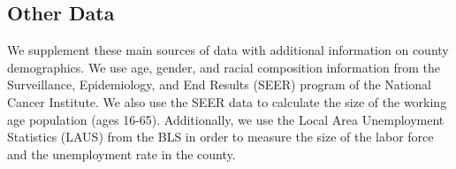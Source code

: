 \subsection{Other Data}
We supplement these main sources of data with additional information on county demographics. We use age, gender, and racial composition information from the Surveillance, Epidemiology, and End Results (SEER) program of the National Cancer Institute. We also use the SEER data to calculate the size of the working age population (ages 16-65). Additionally, we use the Local Area Unemployment Statistics (LAUS) from the BLS in order to measure the size of the labor force and the unemployment rate in the county. 